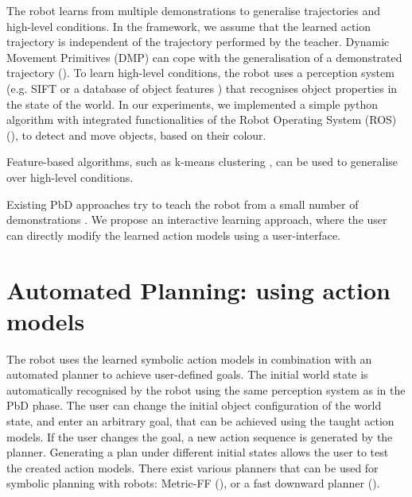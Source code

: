 The robot learns from multiple demonstrations to generalise trajectories and high-level conditions.
In the framework, we assume that the learned action trajectory is independent of the trajectory performed by the teacher.
Dynamic Movement Primitives (DMP) can cope with the generalisation of a demonstrated trajectory (\cite{pastor2009learning}).
To learn high-level conditions, the robot uses a perception system (e.g. SIFT \cite{ahmadzadeh2015learning} or a database of object features \cite{mason2011robot}) that recognises object properties in the state of the world. 
In our experiments, we implemented a simple python algorithm with integrated functionalities of the Robot Operating System (ROS) (\cite{quigley2009ros}), to detect and move objects, based on their colour.

Feature-based algorithms, such as k-means clustering \cite{mollard2015robot}, can be used to generalise over high-level conditions.


Existing PbD approaches try to teach the robot from a small number of demonstrations \cite{orendt2016robot,abdo2013learning}.
We propose an interactive learning approach, where the user can directly modify the learned action models using a user-interface.


\section{Automated Planning: using action models}\label{sec:AP}
The robot uses the learned symbolic action models in combination with an automated planner to achieve user-defined goals. 
The initial world state is automatically recognised by the robot using the same perception system as in the PbD phase. 
The user can change the initial object configuration of the world state, and enter an arbitrary goal, that can be achieved using the taught action models.
If the user changes the goal, a new action sequence is generated by the planner.
Generating a plan under different initial states allows the user to test the created action models.
There exist various planners that can be used for symbolic planning with robots: Metric-FF (\cite{cubek2015high}), or a fast downward planner (\cite{abdo2013learning}). 



